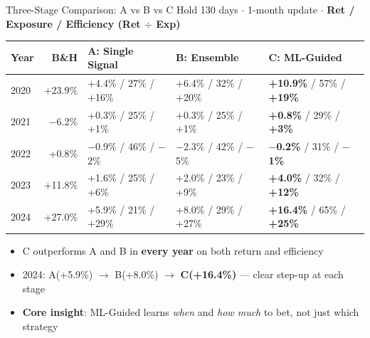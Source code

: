 \documentclass[aspectratio=169]{beamer}
\begin{document}
\begin{frame}{Three-Stage Comparison: A vs B vs C}
  \small
  Hold 130 days $\cdot$ 1-month update $\cdot$ \textbf{Ret / Exposure / Efficiency (Ret $\div$ Exp)}

  \vspace{0.4em}
  \begin{tabular}{lrp{2.8cm}p{2.8cm}p{3.0cm}}
    \toprule
    Year & B\&H & A: Single Signal & B: Ensemble & C: ML-Guided \\
    \midrule
    2020 & +23.9\% & +4.4\% / 27\% / +16\%  & +6.4\% / 32\% / +20\% & \textbf{+10.9\%} / 57\% / \textbf{+19\%} \\
    2021 & $-$6.2\%  & +0.3\% / 25\% / +1\%  & +0.3\% / 25\% / +1\%  & \textbf{+0.8\%} / 29\% / \textbf{+3\%} \\
    2022 & +0.8\%  & $-$0.9\% / 46\% / $-$2\% & $-$2.3\% / 42\% / $-$5\% & \textbf{$-$0.2\%} / 31\% / \textbf{$-$1\%} \\
    2023 & +11.8\% & +1.6\% / 25\% / +6\%  & +2.0\% / 23\% / +9\%  & \textbf{+4.0\%} / 32\% / \textbf{+12\%} \\
    2024 & +27.0\% & +5.9\% / 21\% / +29\% & +8.0\% / 29\% / +27\% & \textbf{+16.4\%} / 65\% / \textbf{+25\%} \\
    \bottomrule
  \end{tabular}

  \vspace{0.5em}
  \begin{itemize}
    \item C outperforms A and B in \textbf{every year} on both return and efficiency
    \item 2024: A(+5.9\%) $\to$ B(+8.0\%) $\to$ \textbf{C(+16.4\%)} — clear step-up at each stage
    \item \textbf{Core insight}: ML-Guided learns \emph{when} and \emph{how much} to bet, not just which strategy
  \end{itemize}
\end{frame}
\end{document}

